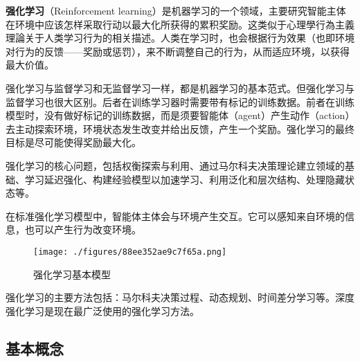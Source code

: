 
\textbf{强化学习}（Reinforcement learning）是机器学习的一个领域，主要研究智能主体在环境中应该怎样采取行动以最大化所获得的累积奖励。这类似于心理學行為主義理論关于人类学习行为的相关描述。人类在学习时，也会根据行为效果（也即环境对行为的反馈——奖励或惩罚），来不断调整自己的行为，从而适应环境，以获得最大价值。

强化学习与监督学习和无监督学习一样，都是机器学习的基本范式。但强化学习与监督学习也很大区别。后者在训练学习器时需要带有标记的训练数据。前者在训练模型时，没有做好标记的训练数据，而是须要智能体（agent）产生动作（action）去主动探索环境，环境状态发生改变并给出反馈，产生一个奖励。强化学习的最终目标是尽可能使得奖励最大化。

强化学习的核心问题，包括权衡探索与利用、通过马尔科夫决策理论建立领域的基础、学习延迟强化、构建经验模型以加速学习、利用泛化和层次结构、处理隐藏状态等。

在标准强化学习模型中，智能体主体会与环境产生交互。它可以感知来自环境的信息，也可以产生行为改变环境。

\begin{figure}[ht]
\centering
\texttt{[image: ./figures/88ee352ae9c7f65a.png]}
\caption{强化学习基本模型} \label{fig_rl_1}
\end{figure}

强化学习的主要方法包括：马尔科夫决策过程、动态规划、时间差分学习等。深度强化学习是现在最广泛使用的强化学习方法。

\subsection{基本概念}

